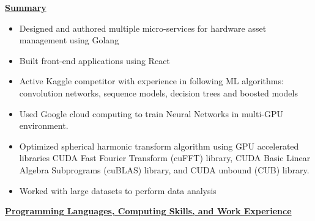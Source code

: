 \documentclass[11pt]{ltxdoc}
\begin{document}
\vskip 18pt

\begin{center}
	\textbf{\underline{Summary}}
\end{center}

\begin{itemize}
	\item Designed and authored multiple micro-services for hardware asset management using Golang
	\item Built front-end applications using React
	\item Active Kaggle competitor with experience in following ML algorithms: convolution networks, sequence models, decision trees and boosted models
	\item Used Google cloud computing to train Neural Networks in multi-GPU
environment.
	\item Optimized spherical harmonic transform algorithm using GPU accelerated libraries CUDA Fast Fourier Transform (cuFFT) library,
CUDA Basic Linear Algebra Subprograms (cuBLAS) library, and
CUDA unbound (CUB) library.
	\item Worked with large datasets to perform data analysis

\end{itemize}

\vskip 18pt

\begin{center}
	\textbf{\underline{Programming Languages, Computing Skills, and Work Experience}}
\end{center}
\end{document}
